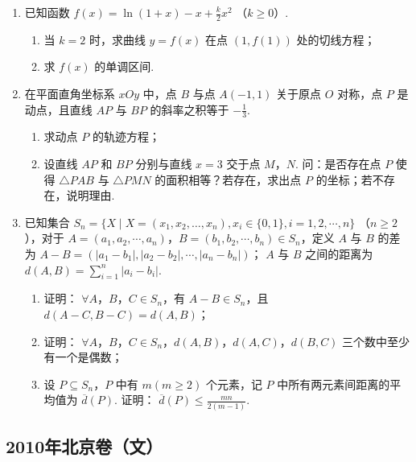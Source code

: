 \begin{description}
\begin{enumerate}[leftmargin=5pt]
        \item 已知函数 \( f(x) = \ln\left(1 + x\right) - x + \frac{k}{2}x^2 \) （\(k \geqslant 0\)）.
\begin{enumerate}
\item 当 \(k=2\) 时，求曲线 \( y=f(x) \) 在点 \( (1,f(1)) \) 处的切线方程；
\item 求 \( f(x) \) 的单调区间.
\end{enumerate}

        \item 在平面直角坐标系 \(xOy\) 中，点 \(B\) 与点 \(A(-1,1)\) 关于原点 \(O\) 对称，点 \(P\) 是动点，且直线 \(AP\) 与 \(BP\) 的斜率之积等于 \(-\frac{1}{3}\).
\begin{enumerate}
\item 求动点 \(P\) 的轨迹方程；
\item 设直线 \(AP\) 和 \(BP\) 分别与直线 \(x = 3\) 交于点 \(M\)，\(N\). 问：是否存在点 \(P\) 使得 \(\triangle PAB\) 与 \(\triangle PMN\) 的面积相等？若存在，求出点 \(P\) 的坐标；若不存在，说明理由.
\end{enumerate}

        \item 已知集合 \( S_{n} = \{X \mid X = (x_{1}, x_{2}, \ldots, x_{n}), x_{i} \in \{0, 1\}, i = 1, 2, \cdots, n\} \) （\( n \geqslant 2 \)），对于 \( A = (a_{1}, a_{2}, \cdots, a_{n}) \)，\( B = (b_{1}, b_{2}, \cdots, b_{n}) \in S_{n} \)，定义 \(A\) 与 \(B\) 的差为 \( A - B = (|a_{1} - b_{1}|, |a_{2} - b_{2}|, \cdots, |a_{n} - b_{n}|) \)； \(A\) 与 \(B\) 之间的距离为 \( d(A, B) = \sum_{i=1}^{n} |a_{i} - b_{i}| \).
\begin{enumerate}
\item 证明： \(\forall A\)，\(B\)，\(C \in S_n\)，有 \(A - B \in S_n\)，且 \(d(A - C, B - C) = d(A, B)\)；
\item 证明： \(\forall A\)，\(B\)，\(C \in S_n\)，\(d(A, B)\)，\(d(A, C)\)，\(d(B, C)\) 三个数中至少有一个是偶数；
\item 设 \(P \subseteq S_n\)，\(P\) 中有 \(m (m \geqslant 2)\) 个元素，记 \(P\) 中所有两元素间距离的平均值为 \(\overline{d}(P)\). 证明： \(\overline{d}(P) \leqslant \frac{mn}{2(m - 1)}\).
\end{enumerate}

    \end{enumerate}

\end{description}


\subsection{2010年北京卷（文）}\label{gk:2010年北京卷（文）}

